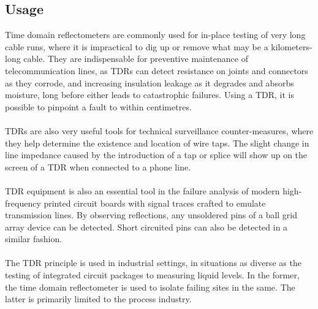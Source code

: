 \documentclass[english]{article}
\begin{document}
\subsection{Usage}
Time domain reflectometers are commonly used for in-place testing of very long cable runs, where it is impractical to dig up or remove what may be a kilometers-long cable. They are indispensable for preventive maintenance of telecommunication lines, as TDRs can detect resistance on joints and connectors as they corrode, and increasing insulation leakage as it degrades and absorbs moisture, long before either leads to catastrophic failures. Using a TDR, it is possible to pinpoint a fault to within centimetres.\\\\
TDRs are also very useful tools for technical surveillance counter-measures, where they help determine the existence and location of wire taps. The slight change in line impedance caused by the introduction of a tap or splice will show up on the screen of a TDR when connected to a phone line.\\\\
TDR equipment is also an essential tool in the failure analysis of modern high-frequency printed circuit boards with signal traces crafted to emulate transmission lines. By observing reflections, any unsoldered pins of a ball grid array device can be detected. Short circuited pins can also be detected in a similar fashion.\\\\
The TDR principle is used in industrial settings, in situations as diverse as the testing of integrated circuit packages to measuring liquid levels. In the former, the time domain reflectometer is used to isolate failing sites in the same. The latter is primarily limited to the process industry.
\end{document}
